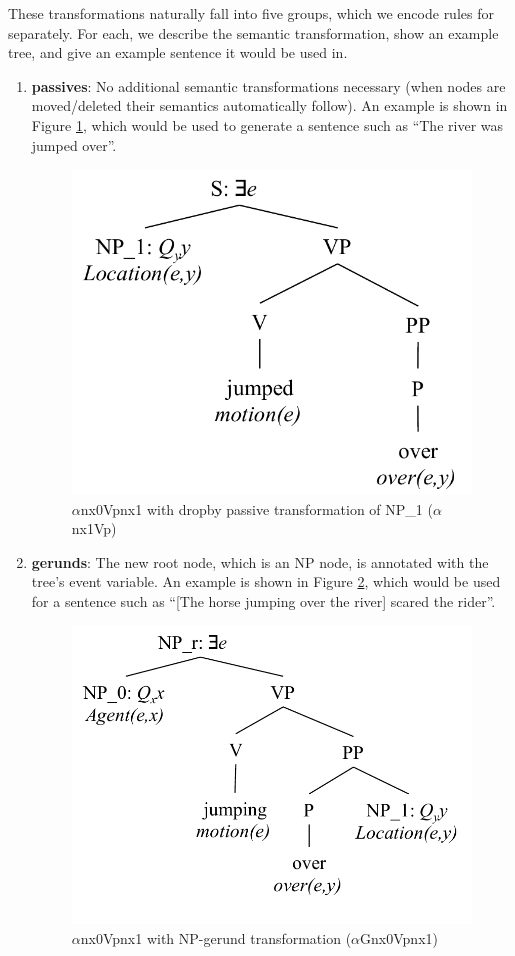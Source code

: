 \documentclass[11pt,a4paper]{article}
\begin{document}
These transformations naturally fall into five groups, which we encode rules for separately. For each, we describe the semantic transformation, show an example tree, and give an example sentence it would be used in.
\begin{enumerate}
    \item \textbf{passives}: No additional semantic transformations necessary (when nodes are moved/deleted their semantics automatically follow). An example is shown in Figure \ref{fig:jump_passive_semantics}, which would be used to generate a sentence such as ``The river was jumped over''.

    \begin{figure}[H]
    \begin{centering}
    \includegraphics[width=.6 \linewidth ]{resources/ch5_resources/jump_passive_semantics.pdf}
    \caption{$\alpha$nx0Vpnx1 with dropby passive transformation of NP\_1 ($\alpha$nx1Vp)}
    \label{fig:jump_passive_semantics}
    \end{centering}
    \end{figure}

    \item \textbf{gerunds}: The new root node, which is an NP node, is annotated with the tree's event variable. An example is shown in Figure \ref{fig:jump_gerund_semantics}, which would be used for a sentence such as ``[The horse jumping over the river] scared the rider''.

    \begin{figure}[H]
    \begin{centering}
    \includegraphics[width=.6 \linewidth ]{resources/ch5_resources/jump_gerund_semantics.pdf}
    \caption{$\alpha$nx0Vpnx1 with NP-gerund transformation ($\alpha$Gnx0Vpnx1)}
    \label{fig:jump_gerund_semantics}
    \end{centering}
    \end{figure}


\end{enumerate}
\end{document}
